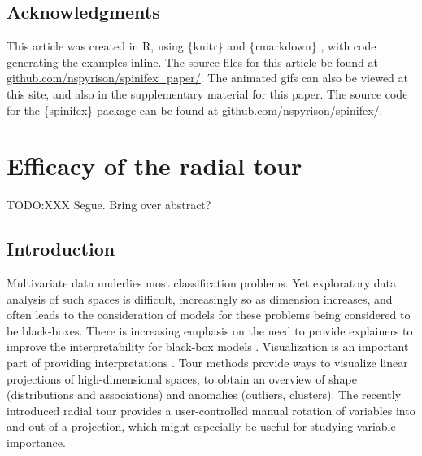 \documentclass{monashthesis}
\begin{document}
\hypertarget{acknowledgments}{%
\section{Acknowledgments}\label{acknowledgments}}

This article was created in R, using \{knitr\} \autocite{xie_knitr_2020} and \{rmarkdown\} \autocite{allaire_rmarkdown_2020}, with code generating the examples inline. The source files for this article be found at \href{https://github.com/nspyrison/spinifex_paper/}{github.com/nspyrison/spinifex\_paper/}. The animated gifs can also be viewed at this site, and also in the supplementary material for this paper. The source code for the \{spinifex\} package can be found at \href{https://github.com/nspyrison/spinifex/}{github.com/nspyrison/spinifex/}.

\hypertarget{ch:efficacy_radial_tour}{%
\chapter{Efficacy of the radial tour}\label{ch:efficacy_radial_tour}}

TODO:XXX Segue. Bring over abstract?

\hypertarget{introduction-1}{%
\section{Introduction}\label{introduction-1}}

Multivariate data underlies most classification problems. Yet exploratory data analysis \autocite[EDA,][]{tukey_exploratory_1977} of such spaces is difficult, increasingly so as dimension increases, and often leads to the consideration of models for these problems being considered to be black-boxes. There is increasing emphasis on the need to provide explainers to improve the interpretability for black-box models \autocite{biecek_dalex_2018,biecek_explanatory_2021,lundberg_unified_2017,ribeiro_why_2016,wickham_visualizing_2015}. Visualization is an important part of providing interpretations \autocite{anscombe_graphs_1973,coleman_geometric_1986,goodman_dirty_2008,matejka_same_2017}. Tour methods \autocite{lee_review_2021,cook_grand_2008} provide ways to visualize linear projections of high-dimensional spaces, to obtain an overview of shape (distributions and associations) and anomalies (outliers, clusters). The recently introduced radial tour \autocite{spyrison_spinifex_2020} provides a user-controlled manual rotation of variables into and out of a projection, which might especially be useful for studying variable importance.
\end{document}
